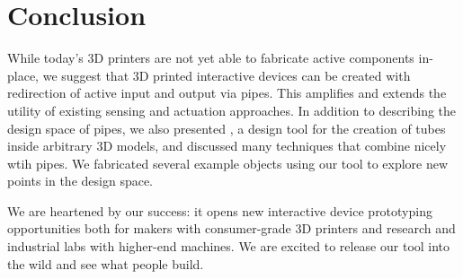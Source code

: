 \section{Conclusion}

While today's 3D printers are not yet able to fabricate active components in-place, we suggest that 3D printed interactive devices can be created with redirection of active input and output via pipes.  This amplifies and extends the utility of existing sensing and actuation approaches.  In addition to describing the design space of pipes, we also presented \systemnamenospace, a design tool for the creation of tubes inside arbitrary 3D models, and discussed many techniques that combine nicely wtih pipes.  We fabricated several example objects using our tool to explore new points in the design space.

We are heartened by our success: it opens new interactive device prototyping opportunities both for makers with consumer-grade 3D printers and research and industrial labs with higher-end machines.  We are excited to release our tool into the wild and see what people build.